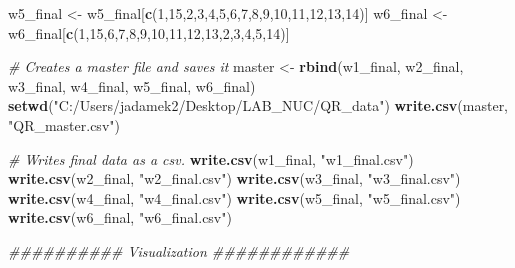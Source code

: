 \documentclass[
]{book}
\newenvironment{Shaded}{\begin{snugshade}}{\end{snugshade}}
\newcommand{\CommentTok}[1]{\textcolor[rgb]{0.56,0.35,0.01}{\textit{#1}}}
\newcommand{\DecValTok}[1]{\textcolor[rgb]{0.00,0.00,0.81}{#1}}
\newcommand{\KeywordTok}[1]{\textcolor[rgb]{0.13,0.29,0.53}{\textbf{#1}}}
\newcommand{\NormalTok}[1]{#1}
\newcommand{\StringTok}[1]{\textcolor[rgb]{0.31,0.60,0.02}{#1}}
\begin{document}
\begin{Shaded}
\begin{Highlighting}[]
\NormalTok{w5_final <-}\StringTok{ }\NormalTok{w5_final[}\KeywordTok{c}\NormalTok{(}\DecValTok{1}\NormalTok{,}\DecValTok{15}\NormalTok{,}\DecValTok{2}\NormalTok{,}\DecValTok{3}\NormalTok{,}\DecValTok{4}\NormalTok{,}\DecValTok{5}\NormalTok{,}\DecValTok{6}\NormalTok{,}\DecValTok{7}\NormalTok{,}\DecValTok{8}\NormalTok{,}\DecValTok{9}\NormalTok{,}\DecValTok{10}\NormalTok{,}\DecValTok{11}\NormalTok{,}\DecValTok{12}\NormalTok{,}\DecValTok{13}\NormalTok{,}\DecValTok{14}\NormalTok{)]}
\NormalTok{w6_final <-}\StringTok{ }\NormalTok{w6_final[}\KeywordTok{c}\NormalTok{(}\DecValTok{1}\NormalTok{,}\DecValTok{15}\NormalTok{,}\DecValTok{6}\NormalTok{,}\DecValTok{7}\NormalTok{,}\DecValTok{8}\NormalTok{,}\DecValTok{9}\NormalTok{,}\DecValTok{10}\NormalTok{,}\DecValTok{11}\NormalTok{,}\DecValTok{12}\NormalTok{,}\DecValTok{13}\NormalTok{,}\DecValTok{2}\NormalTok{,}\DecValTok{3}\NormalTok{,}\DecValTok{4}\NormalTok{,}\DecValTok{5}\NormalTok{,}\DecValTok{14}\NormalTok{)]}




\CommentTok{# Creates a master file and saves it}
\NormalTok{master <-}\StringTok{ }\KeywordTok{rbind}\NormalTok{(w1_final, w2_final, w3_final, w4_final, w5_final, w6_final)}
\KeywordTok{setwd}\NormalTok{(}\StringTok{"C:/Users/jadamek2/Desktop/LAB_NUC/QR_data"}\NormalTok{)}
\KeywordTok{write.csv}\NormalTok{(master, }\StringTok{"QR_master.csv"}\NormalTok{)}

\CommentTok{# Writes final data as a csv.}
\KeywordTok{write.csv}\NormalTok{(w1_final, }\StringTok{"w1_final.csv"}\NormalTok{)}
\KeywordTok{write.csv}\NormalTok{(w2_final, }\StringTok{"w2_final.csv"}\NormalTok{)}
\KeywordTok{write.csv}\NormalTok{(w3_final, }\StringTok{"w3_final.csv"}\NormalTok{)}
\KeywordTok{write.csv}\NormalTok{(w4_final, }\StringTok{"w4_final.csv"}\NormalTok{)}
\KeywordTok{write.csv}\NormalTok{(w5_final, }\StringTok{"w5_final.csv"}\NormalTok{)}
\KeywordTok{write.csv}\NormalTok{(w6_final, }\StringTok{"w6_final.csv"}\NormalTok{)}


\CommentTok{########## Visualization ############}


\end{Highlighting}
\end{Shaded}
\end{document}
